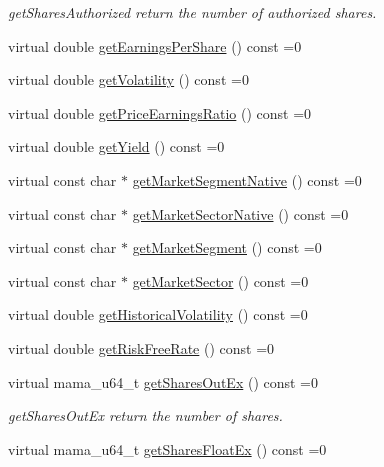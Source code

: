 \begin{CompactItemize}
\begin{CompactList}\small\item\em get\-Shares\-Authorized return the number of authorized shares. \item\end{CompactList}\item 
virtual double \hyperlink{classWombat_1_1MamdaFundamentals_7e942012bd9711d3bde88b1da09be638}{get\-Earnings\-Per\-Share} () const =0
\item 
virtual double \hyperlink{classWombat_1_1MamdaFundamentals_e5719741fcc970ea66688ed60f6541ad}{get\-Volatility} () const =0
\item 
virtual double \hyperlink{classWombat_1_1MamdaFundamentals_1072c58f01ad734655f34332bc9e8055}{get\-Price\-Earnings\-Ratio} () const =0
\item 
virtual double \hyperlink{classWombat_1_1MamdaFundamentals_3d9a05c2c0adbb5acaf08d4bc1cce29c}{get\-Yield} () const =0
\item 
virtual const char $\ast$ \hyperlink{classWombat_1_1MamdaFundamentals_e72366f03a1ddcaa3d0e75fafaaddf60}{get\-Market\-Segment\-Native} () const =0
\item 
virtual const char $\ast$ \hyperlink{classWombat_1_1MamdaFundamentals_185d4ae26f9a5f362b01dff364f9c9ee}{get\-Market\-Sector\-Native} () const =0
\item 
virtual const char $\ast$ \hyperlink{classWombat_1_1MamdaFundamentals_f96bd6fe7c76ce21ccebff0e1090ab4e}{get\-Market\-Segment} () const =0
\item 
virtual const char $\ast$ \hyperlink{classWombat_1_1MamdaFundamentals_b49dbddda075e93738faebcc391ac223}{get\-Market\-Sector} () const =0
\item 
virtual double \hyperlink{classWombat_1_1MamdaFundamentals_be98df579caf8109ed31669009a0a4b1}{get\-Historical\-Volatility} () const =0
\item 
virtual double \hyperlink{classWombat_1_1MamdaFundamentals_b2e1924e7f3329a29376f6ac60c7972e}{get\-Risk\-Free\-Rate} () const =0
\item 
virtual mama\_\-u64\_\-t \hyperlink{classWombat_1_1MamdaFundamentals_f4229948e3f79b0cc686985243a14749}{get\-Shares\-Out\-Ex} () const =0
\begin{CompactList}\small\item\em get\-Shares\-Out\-Ex return the number of shares. \item\end{CompactList}\item 
virtual mama\_\-u64\_\-t \hyperlink{classWombat_1_1MamdaFundamentals_9fad5ad5bb06171cccd8e9b5a6633793}{get\-Shares\-Float\-Ex} () const =0

\end{CompactItemize}
